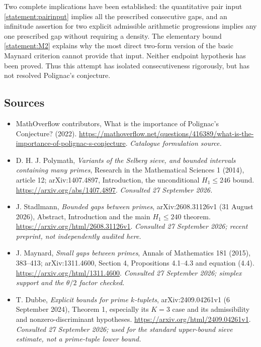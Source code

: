 \documentclass[11pt,a4paper]{article}
\numberwithin{equation}{section}
\begin{document}
Two complete implications have been established: the quantitative pair input
\eqref{statement:pairinput} implies all the prescribed consecutive gaps, and an
infinitude assertion for two explicit admissible arithmetic progressions
implies any one prescribed gap without requiring a density. The elementary
bound \eqref{statement:M2} explains why the most direct two-form version of the
basic Maynard criterion cannot provide that input. Neither endpoint
hypothesis has been proved. Thus this attempt has isolated consecutiveness
rigorously, but has not resolved Polignac's conjecture.
\subsection{Sources}
\begin{itemize}\raggedright
\item[\textnormal{[S1]}]\hypertarget{source:statement:1}{} MathOverflow contributors, What is the importance of Polignac's Conjecture? (2022).
\url{https://mathoverflow.net/questions/416389/what-is-the-importance-of-polignac-s-conjecture}.
{\small\textit{Catalogue formulation source.}}
\item[\textnormal{[E1]}]\hypertarget{extra:statement:1}{} D. H. J. Polymath,
\emph{Variants of the Selberg sieve, and bounded intervals containing many
primes}, Research in the Mathematical Sciences 1 (2014), article 12;
arXiv:1407.4897, Introduction, the unconditional $H_1\leq246$ bound.
\url{https://arxiv.org/abs/1407.4897}.
{\small\textit{Consulted 27 September 2026.}}
\item[\textnormal{[E2]}]\hypertarget{extra:statement:2}{} J. Stadlmann,
\emph{Bounded gaps between primes}, arXiv:2608.31126v1
(31 August 2026), Abstract, Introduction and the main $H_1\leq240$ theorem.
\url{https://arxiv.org/html/2608.31126v1}.
{\small\textit{Consulted 27 September 2026; recent preprint, not independently audited here.}}
\item[\textnormal{[E3]}]\hypertarget{extra:statement:3}{} J. Maynard,
\emph{Small gaps between primes}, Annals of Mathematics 181 (2015), 383--413;
arXiv:1311.4600, Section 4, Propositions 4.1--4.3 and equation (4.4).
\url{https://arxiv.org/html/1311.4600}.
{\small\textit{Consulted 27 September 2026; simplex support and the $\theta/2$ factor checked.}}
\item[\textnormal{[E4]}]\hypertarget{extra:statement:4}{} T. Dubbe,
\emph{Explicit bounds for prime $k$-tuplets}, arXiv:2409.04261v1
(6 September 2024), Theorem 1, especially its $K=3$ case and its
admissibility and nonzero-discriminant hypotheses.
\url{https://arxiv.org/html/2409.04261v1}.
{\small\textit{Consulted 27 September 2026; used for the standard upper-bound sieve estimate, not a prime-tuple lower bound.}}
\end{itemize}
\end{document}

